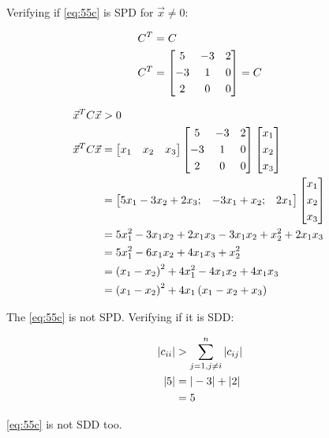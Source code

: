 		Verifying if \cref{eq:55c} is SPD for $\vec{x} \neq 0$:

		\begin{align}
			C^{T} &= C& \notag \\
			C^{T} &= \begin{bmatrix}
					5 & -3 & 2 \\[0.3em]
					-3 & 1 & 0 \\[0.3em]
					2 & 0 & 0
				\end{bmatrix} = C&
		\label{eq:55ct}
		\end{align}

		\begin{align}
			\vec{x}^{T}C\vec{x} &> 0& \notag \\
			\vec{x}^{T}C\vec{x} &= \begin{bmatrix}
				x_{1} & x_{2} & x_{3}
				\end{bmatrix}
				\begin{bmatrix}
					5 & -3 & 2 \\[0.3em]
					-3 & 1 & 0 \\[0.3em]
					2 & 0 & 0
				\end{bmatrix}
				\begin{bmatrix}
					x_{1} \\[0.3em]
					x_{2} \\[0.3em]
					x_{3}
				\end{bmatrix}& \\
			&= \begin{bmatrix}
					5x_{1} - 3x_{2} + 2x_{3}; & -3x_{1} + x_{2}; & 2x_{1}
				\end{bmatrix}
				\begin{bmatrix}
					x_{1} \\[0.3em]
					x_{2} \\[0.3em]
					x_{3}
				\end{bmatrix}& \notag \\
			& = 5x_{1}^{2} - 3x_{1}x_{2} + 2x_{1}x_{3} - 3x_{1}x_{2} + x_{2}^{2} + 2x_{1}x_{3}& \notag \\
			& = 5x_{1}^{2} - 6x_{1}x_{2} + 4x_{1}x_{3} + x_{2}^{2}& \notag \\
			& = \left(x_{1} - x_{2}\right)^{2} + 4x_{1}^{2} - 4x_{1}x_{2} + 4x_{1}x_{3}& \notag \\
			& = \left(x_{1} - x_{2}\right)^{2} + 4x_{1}\left(x_{1} - x_{2} + x_{3}\right)&
		\label{eq:55cxtcx}
		\end{align}

		The \cref{eq:55c} is not SPD. Verifying if it is SDD:

		\begin{align}
			\left|c_{ii}\right| &> \sum_{j=1,j \neq i}^{n} \left|c_{ij}\right|& \\
			|5| &= |-3| + |2|& \notag \\
			&= 5 &
 		\label{eq:55csdd}
		\end{align}

		\cref{eq:55c} is not SDD too.